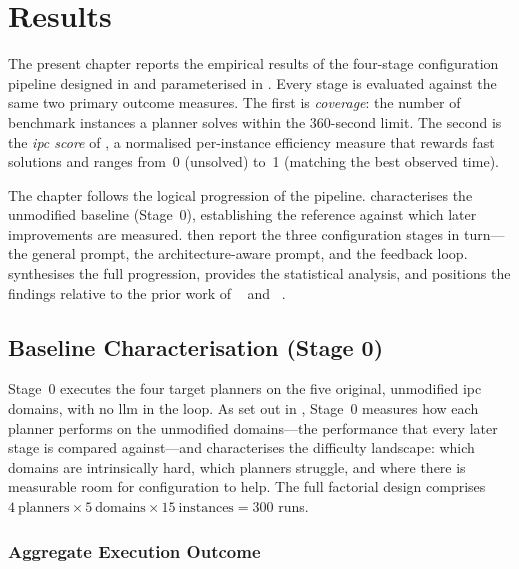 \chapter{Results}\label{ch:results}

The present chapter reports the empirical results of the four-stage configuration pipeline designed in  and parameterised in .
Every stage is evaluated against the same two primary outcome measures.
The first is \emph{coverage}: the number of benchmark instances a planner solves within the 360-second limit.
The second is the \emph{\gls{ipc} score} of , a normalised per-instance efficiency measure that rewards fast solutions and ranges from~0 (unsolved) to~1 (matching the best observed time).

The chapter follows the logical progression of the pipeline.
 characterises the unmodified baseline (Stage~0), establishing the reference against which later improvements are measured.
 then report the three configuration stages in turn---the general prompt, the architecture-aware prompt, and the feedback loop.
 synthesises the full progression,  provides the statistical analysis, and  positions the findings relative to the prior work of \citeauthor{Elis2025}~\cite{Elis2025} and \citeauthor{Georgievski2025}~\cite{Georgievski2025}.

\section{Baseline Characterisation (Stage 0)}
\label{sec:results:stage0}

Stage~0 executes the four target planners on the five original, unmodified \gls{ipc} domains, with no \gls{llm} in the loop.
As set out in , Stage~0 measures how each planner performs on the unmodified domains---the performance that every later stage is compared against---and characterises the difficulty landscape: which domains are intrinsically hard, which planners struggle, and where there is measurable room for configuration to help.
The full factorial design comprises $4~\text{planners} \times 5~\text{domains} \times 15~\text{instances} = 300$ runs.

\subsection{Aggregate Execution Outcome}
\label{sec:results:stage0:aggregate}

